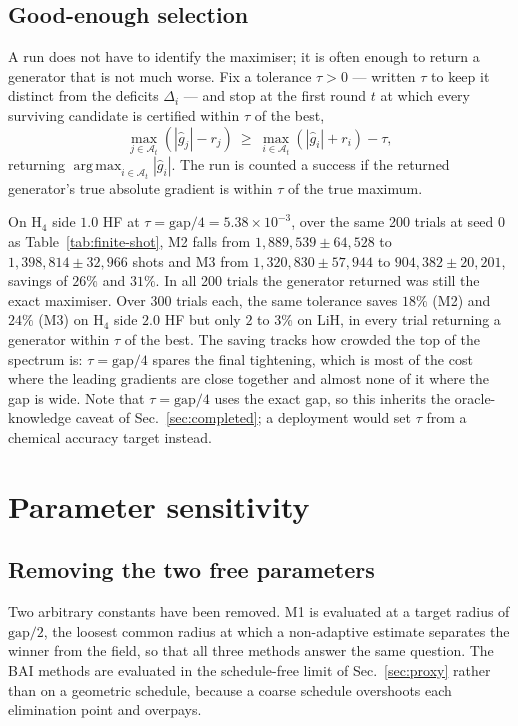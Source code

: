 \documentclass[10pt]{article}
\newcommand{\argmax}{\operatorname*{arg\,max}}
\begin{document}
\subsection{Good-enough selection}
\label{sec:good-enough}

A run does not have to identify the maximiser; it is often enough to return a
generator that is not much worse. Fix a tolerance $\tau>0$ --- written $\tau$ to
keep it distinct from the deficits $\Delta_i$ --- and stop at the first round $t$
at which every surviving candidate is certified within $\tau$ of the best,
\begin{equation}
  \max_{j\in\mathcal A_t}\left(|\widehat g_j|-r_j\right)
  \ \ge\
  \max_{i\in\mathcal A_t}\left(|\widehat g_i|+r_i\right)-\tau ,
  \label{eq:good-enough}
\end{equation}
returning $\argmax_{i\in\mathcal A_t}|\widehat g_i|$. The run is counted a success
if the returned generator's true absolute gradient is within $\tau$ of the true
maximum.

On H$_4$ side $1.0$ HF at $\tau=\mathrm{gap}/4=5.38\times10^{-3}$, over the same
200 trials at seed $0$ as Table~\ref{tab:finite-shot}, M2 falls from
$1{,}889{,}539\pm64{,}528$ to $1{,}398{,}814\pm32{,}966$ shots and M3 from
$1{,}320{,}830\pm57{,}944$ to $904{,}382\pm20{,}201$, savings of $26\%$ and $31\%$.
In all 200 trials the generator returned was still the exact maximiser. Over 300
trials each, the same tolerance saves $18\%$ (M2) and $24\%$ (M3) on H$_4$ side
$2.0$ HF but only $2$ to $3\%$ on LiH, in every trial returning a generator
within $\tau$ of the best. The saving tracks how crowded the top of the spectrum
is: $\tau=\mathrm{gap}/4$ spares the final tightening, which is most of the cost
where the leading gradients are close together and almost none of it where the
gap is wide. Note that $\tau=\mathrm{gap}/4$ uses the exact gap, so this inherits
the oracle-knowledge caveat of Sec.~\ref{sec:completed}; a deployment would set
$\tau$ from a chemical accuracy target instead.

\section{Parameter sensitivity}
\label{sec:sensitivity}

\subsection{Removing the two free parameters}

Two arbitrary constants have been removed. M1 is evaluated at a target radius of
$\mathrm{gap}/2$, the loosest common radius at which a non-adaptive estimate
separates the winner from the field, so that all three methods answer the same
question. The BAI methods are evaluated in the schedule-free limit of
Sec.~\ref{sec:proxy} rather than on a geometric schedule, because a coarse
schedule overshoots each elimination point and overpays.
\end{document}
